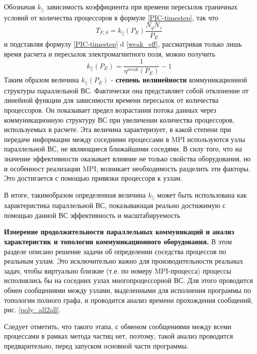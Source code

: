 Обозначая $k_{||}$ зависимость коэффициента при времени пересылок граничных условий от количества процессоров в формуле \ref{PIC-timestep}, так что 
\begin{equation}
T_{F,S} = k_{||} (P_E) \frac{N_y N_z}{P_E}
\end{equation} 
и подставляя формулу \ref{PIC-timestep} d \ref{weak_eff}, рассматривая только лишь время расчета и пересылок электромагнитного поля, можно получить 
\begin{equation}
k_{||} (P_E) = \frac{1}{\eta^{weak}(P_E)} - 1
\end{equation}	  
Таким образом величина $k_{||} (P_E)$  - \textbf{степень нелинейности} коммуникационной структуры параллельной ВС. Фактически она представляет собой отклонение от линейной функции для зависимости времени пересылок от количества процессоров. Он показывает предел возрастания потока данных через коммуникационную структуру ВС при увеличении количества процессоров, используемых в расчете. Эта величина характеризует, в какой степени при передаче информации между соседними процессами в MPI используются узлы параллельной ВС, не являющиеся ближайшими соседями. В силу того, что на значение эффективности оказывает влияние не только свойства оборудования, но и особенност реализации MPI, возникает необходимость разделить эти факторы. Это достигается с помощью привязки процессорв к узлам. 

В итоге, такимобразом определенная  величина $k_{||} $ может быть использована как характеристика параллельной ВС, показывающая реально достижимую с помощью данной ВС эффективность и масштабируемость   

\textbf{Измерение продолжительности параллельных коммуникаций и анализ характеристик и топологии коммуникационного оборудования.}
В этом разделе описано решение задачи об определении соседства процессов по реальным узлам. Это исключительно важно для производительности реальных задач, чтобы виртуально близкие (т.е. по номеру MPI-процесса) процессы исполнялись бы на соседних узлах многопроцессорной ВС. Для этого проводится обмен сообщениями между узлами, выделенными 
для исполнения программы по топологии полного графа, и проводится анализ времени прохождения сообщений, рис. \ref{poly_all2all}.  

Следует отметить, что такого этапа, с обменом сообщениями между всеми процессами в рамках метода частиц нет, поэтому, такой анализ проводится предварительно, перед запуском основной части программы.


